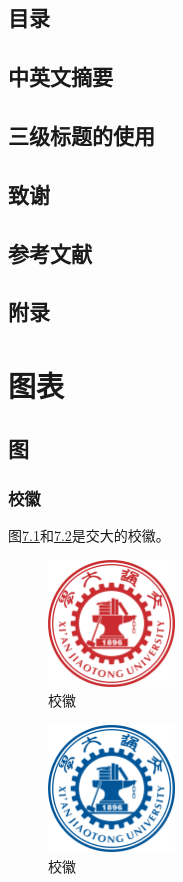 \documentclass[bachelor]{XJTUthesis}
\begin{document}
\section{目录}
\section{中英文摘要}
\section{三级标题的使用}
\section{致谢}
\section{参考文献}
\section{附录}

\chapter{图表}
\section{图}
\subsection{校徽}
图\ref{xiaohui:red}和\ref{xiaohui:blue}是交大的校徽。
\begin{figure}[htbp]
  \centering
  \includegraphics[width=0.3\textwidth]{figures//a3_1jdxhred.png}
  \caption{校徽}\label{xiaohui:red}
\end{figure}

\begin{figure}[htbp]
  \centering
  \includegraphics[width=0.3\textwidth]{figures//a3_2jdxhblue.png}
  \caption{校徽}\label{xiaohui:blue}
\end{figure}
\end{document}
